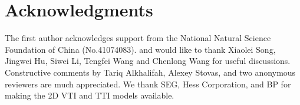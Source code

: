\section{Acknowledgments}
The first author acknowledges support from the National Natural Science Foundation of China (No.41074083).
and would like to thank Xiaolei Song, Jingwei Hu, Siwei Li, Tengfei Wang and
Chenlong Wang for useful discussions.
Constructive comments by Tariq Alkhalifah, Alexey Stovas, and two anonymous reviewers
are much appreciated. We thank SEG, Hess Corporation, and BP for making the
2D VTI and TTI models available.
